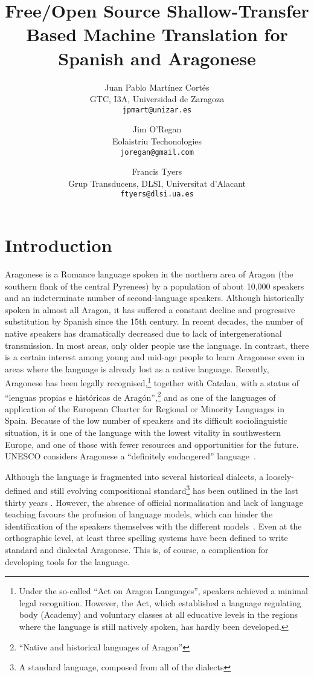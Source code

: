 \documentclass[10pt, a4paper]{article}
\title{Free/Open Source Shallow-Transfer Based Machine Translation for Spanish and Aragonese} %
\author{Juan Pablo Mart\'inez Cort\'es\\ GTC, I3A, Universidad de Zaragoza \\ {\tt jpmart@unizar.es}
\and Jim O’Regan\\ Eolaistriu Techonologies \\ {\tt joregan@gmail.com}
\and Francis Tyers\\ Grup Transducens, DLSI, Universitat d'Alacant \\ {\tt ftyers@dlsi.ua.es}}
\begin{document}
\maketitleabstract{}

  \section{Introduction}
  Aragonese is a Romance language spoken in the northern area of Aragon (the southern flank of the central Pyrenees) by a population of about 10,000 speakers and an indeterminate number of second-language speakers. 
  Although historically spoken in almost all Aragon, it has suffered a constant decline and progressive substitution by Spanish since the 15th century. 
  In recent decades, the number of native speakers has dramatically decreased due to lack of intergenerational transmission. 
  In most areas, only older people use the language. 
  In contrast, there is a certain interest among young and mid-age people to learn Aragonese even in areas where the language is already lost as a native language. Recently, Aragonese has been legally recognised,\footnote{Under the so-called ``Act on Aragon Languages'', speakers achieved a minimal legal recognition. However, the Act, which established a language regulating body (Academy) and voluntary classes at all educative levels in the regions where the language is still natively spoken, has hardly been developed.} together with Catalan, with a status of ``lenguas propias e históricas de Aragón'',\footnote{``Native and historical languages of Aragon''} and as one of the languages of application of the European Charter for Regional or Minority Languages in Spain. 
  Because of the low number of speakers and its difficult sociolinguistic situation, it is one of the language with the lowest vitality in southwestern Europe, and one of those with fewer resources and opportunities for the future. 
  UNESCO considers Aragonese a ``definitely endangered'' language~\cite{UNESCO}.

  Although the language is fragmented into several historical dialects, a loosely-defined and still evolving compositional standard\footnote{A standard language, composed from all of the dialects} has been outlined in the last thirty years \cite{Berceo,Metzeltin,EFA}. However, the absence of official normalisation and lack of language teaching favours the profusion of language models, which can hinder the identification of the speakers themselves with the different models~\cite{Paricio}. Even at the orthographic level, at least three spelling systems have been defined to write standard and dialectal Aragonese. This is, of course, a complication for developing tools for the language. 
\end{document}
